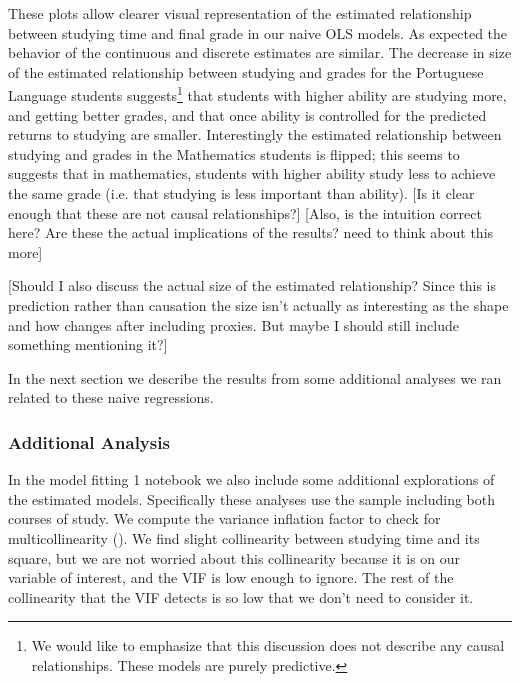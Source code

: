 \documentclass[12pt]{article}
\begin{document}
These plots allow clearer visual representation of the estimated relationship between studying time and final grade in our naive OLS models. As expected the behavior of the continuous and discrete estimates are similar. The decrease in size of the estimated relationship between studying and grades for the Portuguese Language students suggests\footnote{We would like to emphasize that this discussion does not describe any causal relationships. These models are purely predictive.} that students with higher ability are studying more, and getting better grades, and that once ability is controlled for the predicted returns to studying are smaller. Interestingly the estimated relationship between studying and grades in the Mathematics students is flipped; this seems to suggests that in mathematics, students with higher ability study less to achieve the same grade (i.e. that studying is less important than ability). \textcolor{BrickRed}{[Is it clear enough that these are not causal relationships?] [Also, is the intuition correct here? Are these the actual implications of the results? need to think about this more]}

\textcolor{BrickRed}{[Should I also discuss the actual size of the estimated relationship? Since this is prediction rather than causation the size isn't actually as interesting as the shape and how changes after including proxies. But maybe I should still include something mentioning it?]}

In the next section we describe the results from some additional analyses we ran related to these naive regressions.

\subsubsection{Additional Analysis}
In the model fitting 1 notebook we also include some additional explorations of the estimated models. Specifically these analyses use the sample including both courses of study. We compute the variance inflation factor to check for multicollinearity (\cite{VIF, detecting}). We find slight collinearity between studying time and its square, but we are not worried about this collinearity because it is on our variable of interest, and the VIF is low enough to ignore. The rest of the collinearity that the VIF detects is so low that we don't need to consider it.
\end{document}
